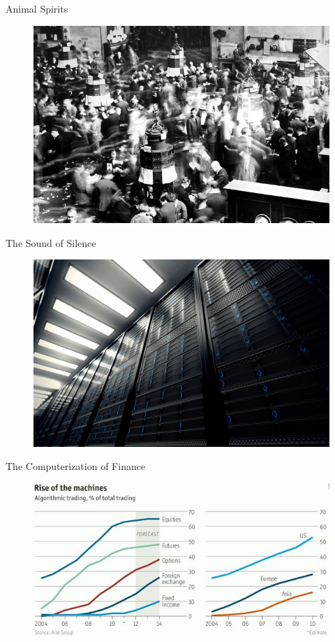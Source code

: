 \begin{frame}{Animal Spirits}

	\begin{figure}
		\centering
		\includegraphics[width=0.7\linewidth]{Images/0_NYSE_1926}
	\end{figure}
\end{frame}


\begin{frame}{The Sound of Silence}
	\begin{figure}
		\centering
		\includegraphics[width=0.7\linewidth]{Images/1_servers}
	\end{figure}
\end{frame}

\begin{frame}{The Computerization of Finance}
	\begin{figure}
		\centering
		\includegraphics[width=0.7\linewidth]{Images/2_algo_trading}
	\end{figure}
\end{frame}


